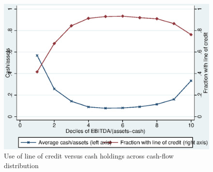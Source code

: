 \documentclass{article}
\begin{document}


\begin{figure}
 \caption{\label{fig2}Use of line of credit versus cash holdings across cash-flow distribution}
 \includegraphics[scale=1]{../tmp/figure_1.eps} 
\end{figure}
\end{document}

